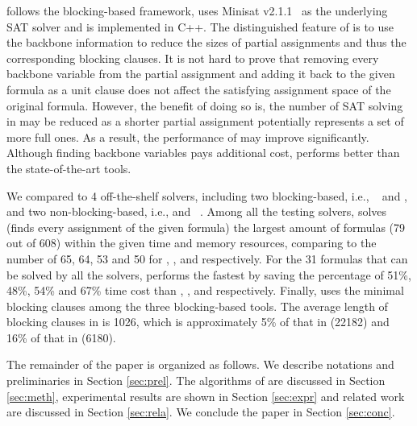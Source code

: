 \tool follows the blocking-based framework, uses Minisat v2.1.1~\cite{minisat} as the underlying SAT solver and is implemented in C++. The distinguished feature of \tool is to use the backbone information to reduce the sizes of partial assignments and thus the corresponding blocking clauses. It is not hard to prove that removing every backbone variable from the partial assignment and adding it back to the given formula as a unit clause does not affect the satisfying assignment space of the original formula. 
However, the benefit of doing so is, the number of SAT solving in \tool may be reduced as a shorter partial assignment potentially represents a set of more full ones. As a result, the performance of \tool may improve significantly. Although finding backbone variables pays additional cost, \tool performs better than the state-of-the-art tools.

We compared \tool to 4 off-the-shelf solvers, including two blocking-based, i.e., \ctool~\cite{ctool} and \bc, and two non-blocking-based, i.e., \nbc and \bdd~\cite{ietool}. Among all the testing solvers, \tool solves (finds every assignment of the given formula) the largest amount of formulas (79 out of 608) within the given time and memory resources, comparing to the number of 65, 64, 53 and 50 for \ctool, \bc, \nbc and \bdd  respectively. 
For the 31 formulas that can be solved by all the solvers, \tool performs the fastest by saving the percentage of 51\%, 48\%, 54\% and 67\% time cost than \ctool, \bc, \nbc and \bdd respectively.
Finally, \tool uses the minimal blocking clauses among the three blocking-based tools. The average length of blocking clauses in \tool is 1026, which is approximately 5\% of that in \ctool (22182) and 16\% of that in \bc (6180). 

The remainder of the paper is organized as follows. We describe notations and preliminaries in Section \ref{sec:prel}. The algorithms of \tool are discussed in Section \ref{sec:meth}, experimental results are shown in Section \ref{sec:expr} and related work are discussed in Section \ref{sec:rela}. We conclude the paper in Section \ref{sec:conc}.

